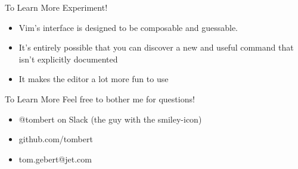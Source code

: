 \documentclass{beamer}
\begin{document}
\begin{frame}{To Learn More}
	Experiment!
	\begin{itemize}
		\item Vim's interface is designed to be composable and guessable.  
		\item It's entirely possible that you can discover a new and useful command that isn't explicitly documented
		\item It makes the editor a lot more fun to use
	\end{itemize}
\end{frame}

\begin{frame}{To Learn More}
	Feel free to bother me for questions!  
	\begin{itemize}
		\item @tombert on Slack (the guy with the smiley-icon)
		\item github.com/tombert
		\item tom.gebert@jet.com
	\end{itemize}
\end{frame}
\end{document}
